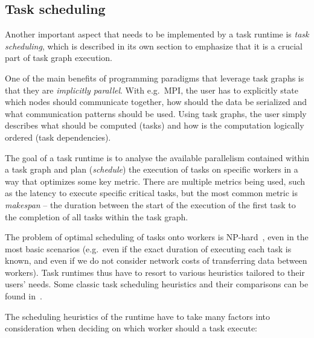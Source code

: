\subsection{Task scheduling}
Another important aspect that needs to be implemented by a task runtime is \emph{task
scheduling}, which is described in its own section to emphasize that it is a crucial part of
task graph execution.

One of the main benefits of programming paradigms that leverage task graphs is that they are
\emph{implicitly parallel}. With e.g.\ MPI, the user has to explicitly state which nodes should
communicate together, how should the data be serialized and what communication patterns should
be used. Using task graphs, the user simply describes what should be computed (tasks) and how is
the computation logically ordered (task dependencies).

The goal of a task runtime is to analyse the available parallelism contained within a task graph
and plan (\emph{schedule}) the execution of tasks on specific workers in a way that
optimizes some key metric. There are multiple metrics being used, such as the latency to execute
specific critical tasks, but the most common metric is \emph{makespan} -- the duration between the
start of the execution of the first task to the completion of all tasks within the task graph.

The problem of optimal scheduling of tasks onto workers is NP-hard~\cite{Ullman1975}, even in
the most basic scenarios (e.g.\ even if the exact duration of executing each task is known,
and even if we do not consider network costs of transferring data between workers). Task
runtimes thus have to resort to various heuristics tailored to their users' needs. Some classic
task scheduling heuristics and their comparisons can be found in~\cite{hlfet1974,
    kwok1998benchmarking,hagras2003static,wang2018list,estee}.

The scheduling heuristics of the runtime have to take many factors into consideration when
deciding on which worker should a task execute:

